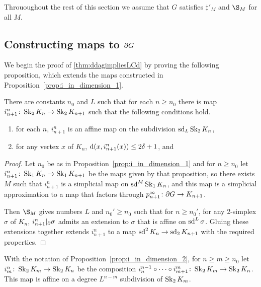 \documentclass[a4paper]{article}
\begin{document}
Thrououghout the rest of this section we assume that $G$ satisfies
$\ddag'_M$ and $\S_M$ for all $M$.

\subsection{Constructing maps to $\partial G$}

We begin the proof of \cref{thm:ddagimpliesLCd} by proving the following 
proposition, which extends the maps constructed in
Proposition~\ref{prop:i_in_dimension_1}.

\begin{proposition}\label{prop:i_in_dimension_2}
  There are constants $n_0$ and $L$ such that for each $n\geq n_0$ there is map
  $i^n_{n+1}\colon\operatorname{Sk}_2 K_n \to \operatorname{Sk}_2 K_{n+1}$ such that the
  following conditions hold.
  \begin{enumerate}
    \item for each $n$, $i^n_{n+1}$ is an affine map on the subdivision
      $\operatorname{sd}_L\operatorname{Sk}_2 K_n$,
    \item for any vertex $x$ of $K_n$, $\operatorname{d}(x, i^n_{n+1}(x)) \leq 2\delta+1$,
      and
  \end{enumerate}
\end{proposition}

\begin{proof} 
  Let $n_0$ be as in Proposition~\ref{prop:i_in_dimension_1} and for $n \geq
  n_0$ let $i^n_{n+1} \colon \operatorname{Sk}_1 K_n \to \operatorname{Sk}_1 K_{n+1}$ be the maps given
  by that proposition, so there exists $M$ such that $i^n_{n+1}$ is a
  simplicial map on $\operatorname{sd}^M\operatorname{Sk}_1 K_n$, and this map is a simplicial
  approximation to a map that factors through $p^\infty_{n+1} \colon \partial G
  \to K_{n+1}$.

  Then $\S_M$ gives numbers $L$ and $n_0' \geq n_0$ such that for $n \geq
  n_0'$, for any 2-simplex $\sigma$ of $K_n$, $i^n_{n+1}\vert_{\partial}
  \sigma$ admits an extension to $\sigma$ that is affine on $\operatorname{sd}^L\sigma$.
  Gluing these extensions together extends $i^n_{n+1}$ to a map $\operatorname{sd}^2 K_n \to
  \operatorname{sd}_2 K_{n+1}$ with the required properties.
\end{proof}

\begin{definition}
  With the notation of Proposition~\ref{prop:i_in_dimension_2}, for $n \geq m
  \geq n_0$ let $i^n_m \colon \operatorname{Sk}_2 K_m \to \operatorname{Sk}_2 K_n$ be the composition
  $i^{n-1}_n \circ \dotsb \circ i^m_{m+1} \colon \operatorname{Sk}_2 K_m \to 
  \operatorname{Sk}_2 K_n$.  This map is affine on a degree $L^{n-m}$ subdivision of 
  $\operatorname{Sk}_2 K_m$.
\end{definition}
\end{document}
